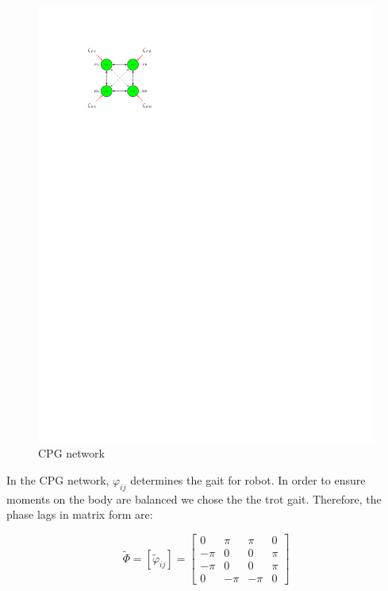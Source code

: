 \documentclass{article}
\begin{document}
\begin{figure}[thpb]
	\centering
		\centering
		\includegraphics[scale = 0.95]{schema_cropped.pdf}
		\centering
		\caption{CPG network}
		\label{fig:CPG_Network}
\end{figure}

In the CPG network, $\varphi_{ij}$ determines the gait for robot. In order to ensure moments on the body are balanced we chose the the trot gait. Therefore, the phase lags in matrix form are:

\begin{equation}
	\tilde{\Phi} = [\tilde{\varphi}_{ij}]=\left[ \begin{array}{rrrr}
	0    & \pi & \pi  & 0   \\
	-\pi & 0   & 0    & \pi  \\
	-\pi & 0   & 0    & \pi   \\
	0    & -\pi&-\pi  & 0 
	\end{array} \right]
\end{equation}
	
\end{document}
